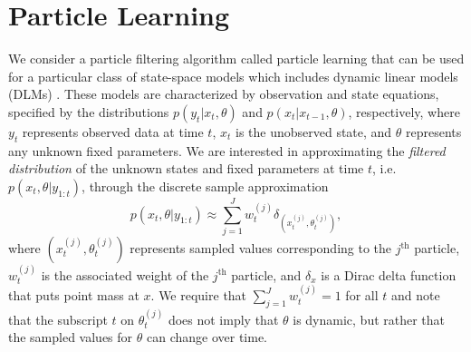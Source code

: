 \documentclass{article}
\begin{document}
\section{Particle Learning}

We consider a particle filtering algorithm called particle learning \citep{Carv:Joha:Lope:Pols:part} that can be used for a particular class of state-space models which includes dynamic linear models (DLMs) \citep{petris2009dynamic}. These models are characterized by observation and state equations, specified by the distributions $p(y_t|x_t,\theta)$ and $p(x_t|x_{t-1},\theta)$, respectively, where $y_t$ represents observed data at time $t$, $x_t$ is the unobserved state, and $\theta$ represents any unknown fixed parameters. We are interested in approximating the \emph{filtered distribution} of the unknown states and fixed parameters at time $t$, i.e. $p(x_t,\theta|y_{1:t})$, through the discrete sample approximation
\begin{equation}
p(x_t,\theta|y_{1:t}) \approx \sum_{j=1}^J w_t^{(j)}\delta_{\left(x_t^{(j)},\theta_t^{(j)}\right)},
\end{equation}
where $\left(x_t^{(j)},\theta_t^{(j)}\right)$ represents sampled values corresponding to the $j^{\mbox{th}}$ particle, $w_t^{(j)}$ is the associated weight of the $j^{\mbox{th}}$ particle, and $\delta_x$ is a Dirac delta function that puts point mass at $x$. We require that $\sum_{j=1}^J w_t^{(j)} = 1$ for all $t$ and note that the subscript $t$ on $\theta_t^{(j)}$ does not imply that $\theta$ is dynamic, but rather that the sampled values for $\theta$ can change over time.
\end{document}
